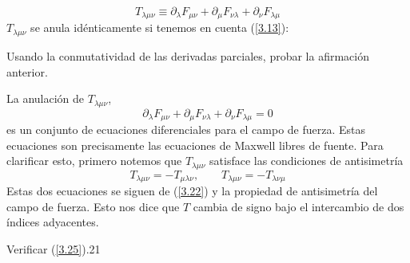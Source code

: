 \begin{equation}\label{3.22}
    T_{\lambda\mu\nu}\equiv \partial_\lambda F_{\mu\nu}+\partial_\mu F_{\nu\lambda}+\partial_\nu F_{\lambda\mu}
\end{equation}
$T_{\lambda\mu\nu}$ se anula idénticamente si tenemos en cuenta (\ref{3.13}):
\begin{tcolorbox}
    Usando la conmutatividad de las derivadas parciales, probar la afirmación anterior.
\end{tcolorbox}
La anulación de $T_{\lambda\mu\nu}$,
\begin{equation}
    \boxed{\partial_\lambda F_{\mu\nu}+\partial_\mu F_{\nu\lambda}+\partial_\nu F_{\lambda\mu}=0}
\end{equation}
es un conjunto de ecuaciones diferenciales para el campo de fuerza. Estas ecuaciones son precisamente las ecuaciones de Maxwell libres de fuente. Para clarificar esto, primero notemos que $T_{\lambda\mu\nu}$ satisface las condiciones de antisimetría
\begin{equation}\label{3.25}
    T_{\lambda\mu\nu}=-T_{\mu\lambda\nu},\qquad T_{\lambda\mu\nu}=-T_{\lambda\nu\mu}
\end{equation}
Estas dos ecuaciones se siguen de (\ref{3.22}) y la propiedad de antisimetría del campo de fuerza. Esto nos dice que $T$ cambia de signo bajo el intercambio de dos índices adyacentes.
\begin{tcolorbox}
    Verificar (\ref{3.25}).21
\end{tcolorbox}

